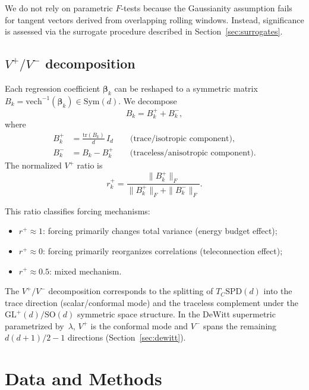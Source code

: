 \documentclass[preprint,12pt]{elsarticle}
\newcommand{\SPD}{\mathrm{SPD}}
\newcommand{\Sym}{\mathrm{Sym}}
\newcommand{\tr}{\mathrm{tr}}
\newcommand{\vech}{\mathrm{vech}}
\newcommand{\GL}{\mathrm{GL}}
\newcommand{\SO}{\mathrm{SO}}
\begin{document}
We do not rely on parametric $F$-tests because the Gaussianity assumption fails for tangent vectors derived from overlapping rolling windows.
Instead, significance is assessed via the surrogate procedure described in Section~\ref{sec:surrogates}.

\subsection{$V^+/V^-$ decomposition}\label{sec:vpvm}

Each regression coefficient $\bm{\beta}_k$ can be reshaped to a symmetric matrix $B_k = \vech^{-1}(\bm{\beta}_k) \in \Sym(d)$.
We decompose
\begin{equation}\label{eq:vpvm}
B_k = B_k^+ + B_k^-,
\end{equation}
where
\begin{align}
B_k^+ &= \frac{\tr(B_k)}{d}\, I_d \qquad \text{(trace/isotropic component)}, \label{eq:vplus}\\
B_k^- &= B_k - B_k^+ \qquad \text{(traceless/anisotropic component)}. \label{eq:vminus}
\end{align}
The normalized $V^+$ ratio is
\begin{equation}\label{eq:vratio}
r_k^+ = \frac{\|B_k^+\|_F}{\|B_k^+\|_F + \|B_k^-\|_F}.
\end{equation}

This ratio classifies forcing mechanisms:
\begin{itemize}
\item $r^+ \approx 1$: forcing primarily changes total variance (energy budget effect);
\item $r^+ \approx 0$: forcing primarily reorganizes correlations (teleconnection effect);
\item $r^+ \approx 0.5$: mixed mechanism.
\end{itemize}

The $V^+/V^-$ decomposition corresponds to the splitting of $T_C\SPD(d)$ into the trace direction (scalar/conformal mode) and the traceless complement under the $\GL^+(d)/\SO(d)$ symmetric space structure.
In the DeWitt supermetric parametrized by~$\lambda$, $V^+$ is the conformal mode and $V^-$ spans the remaining $d(d+1)/2 - 1$ directions (Section~\ref{sec:dewitt}).


\section{Data and Methods}\label{sec:methods}
\end{document}
